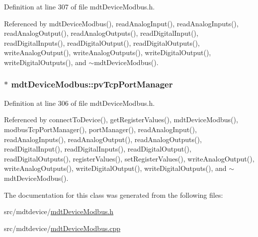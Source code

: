 Definition at line 307 of file mdt\-Device\-Modbus.\-h.



Referenced by mdt\-Device\-Modbus(), read\-Analog\-Input(), read\-Analog\-Inputs(), read\-Analog\-Output(), read\-Analog\-Outputs(), read\-Digital\-Input(), read\-Digital\-Inputs(), read\-Digital\-Output(), read\-Digital\-Outputs(), write\-Analog\-Output(), write\-Analog\-Outputs(), write\-Digital\-Output(), write\-Digital\-Outputs(), and $\sim$mdt\-Device\-Modbus().

\hypertarget{classmdt_device_modbus_a9ecbac63c29b229ab01f5fdb26008c95}{
\subsubsection[{pv\-Tcp\-Port\-Manager}]{$\ast$ mdt\-Device\-Modbus\-::pv\-Tcp\-Port\-Manager\hspace{0.3cm}{\ttfamily [protected]}}}\label{classmdt_device_modbus_a9ecbac63c29b229ab01f5fdb26008c95}


Definition at line 306 of file mdt\-Device\-Modbus.\-h.



Referenced by connect\-To\-Device(), get\-Register\-Values(), mdt\-Device\-Modbus(), modbus\-Tcp\-Port\-Manager(), port\-Manager(), read\-Analog\-Input(), read\-Analog\-Inputs(), read\-Analog\-Output(), read\-Analog\-Outputs(), read\-Digital\-Input(), read\-Digital\-Inputs(), read\-Digital\-Output(), read\-Digital\-Outputs(), register\-Values(), set\-Register\-Values(), write\-Analog\-Output(), write\-Analog\-Outputs(), write\-Digital\-Output(), write\-Digital\-Outputs(), and $\sim$mdt\-Device\-Modbus().



The documentation for this class was generated from the following files\-:\begin{DoxyCompactItemize}
\item 
src/mdtdevice/\hyperlink{mdt_device_modbus_8h}{mdt\-Device\-Modbus.\-h}\item 
src/mdtdevice/\hyperlink{mdt_device_modbus_8cpp}{mdt\-Device\-Modbus.\-cpp}\end{DoxyCompactItemize}
